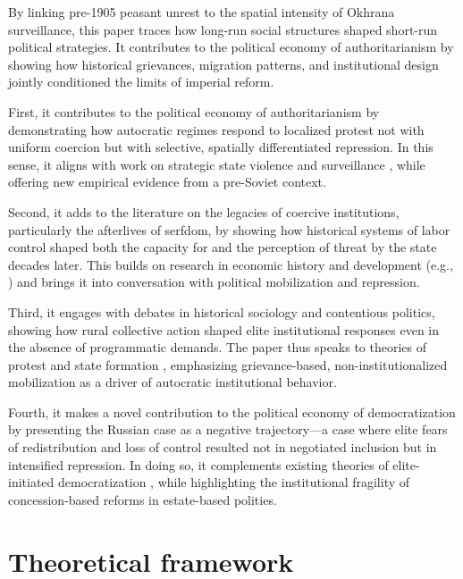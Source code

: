 \documentclass[11pt]{scrarticle}
\begin{document}
By linking pre-1905 peasant unrest to the spatial intensity of Okhrana surveillance, this paper traces how long-run social structures shaped short-run political strategies. It contributes to the political economy of authoritarianism by showing how historical grievances, migration patterns, and institutional design jointly conditioned the limits of imperial reform.

First, it contributes to the political economy of authoritarianism by demonstrating how autocratic regimes respond to localized protest not with uniform coercion but with selective, spatially differentiated repression. In this sense, it aligns with work on strategic state violence and surveillance \parencite{greitens_dictators_2016,dimitrov_why_2013}, while offering new empirical evidence from a pre-Soviet context.

Second, it adds to the literature on the legacies of coercive institutions, particularly the afterlives of serfdom, by showing how historical systems of labor control shaped both the capacity for and the perception of threat by the state decades later. This builds on research in economic history and development (e.g., \cite{buggle_slow_2021,markevich_economic_2018}) and brings it into conversation with political mobilization and repression.

Third, it engages with debates in historical sociology and contentious politics, showing how rural collective action shaped elite institutional responses even in the absence of programmatic demands. The paper thus speaks to theories of protest and state formation \parencite{tilly_mobilization_1978,slater_ordering_2010}, emphasizing grievance-based, non-institutionalized mobilization as a driver of autocratic institutional behavior.

Fourth, it makes a novel contribution to the political economy of democratization by presenting the Russian case as a negative trajectory—a case where elite fears of redistribution and loss of control resulted not in negotiated inclusion but in intensified repression. In doing so, it complements existing theories of elite-initiated democratization \parencite{acemoglu_economic_2005,gandhi_authoritarian_2007}, while highlighting the institutional fragility of concession-based reforms in estate-based polities.
 
\section{Theoretical framework}
\end{document}
